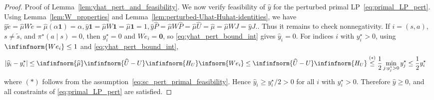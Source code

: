 \documentclass[mnsc,nonblindrev]{informs3}
\newcommand{\Phat}{\widehat{P}}
\newcommand{\one}{\mathbf{1}}
\newcommand{\pistar}{\pi^\star}
\newcommand{\zero}{\mathbf{0}}
\newcommand{\muhat}{\widehat{\mu}}
\newcommand{\uhat}{\widehat{U}}
\newcommand{\yhat}{\widehat{y}}
\begin{document}
\begin{APPENDICES}
\begin{proof}{Proof of Lemma~\ref{lem:yhat_pert_and_feasibility}.}
We now verify feasibility of \(\yhat\) for the perturbed primal
LP~\eqref{eq:primal_LP_pert}. Using Lemma~\ref{lem:W_properties} and Lemma~\ref{lem:perturbed-Uhat-Huhat-identities}, we have
\(
    \yhat\tilde e=\muhat W\tilde e=\muhat(\alpha\one)=\alpha,
    \yhat\one=\muhat W\one=\muhat\one=1, \yhat\Phat=\muhat W\Phat=\muhat\uhat=\muhat=\muhat WJ=\yhat J..
\)
Thus it remains to check nonnegativity. If \(i=(s,a)\), \(s\neq\tilde s\), and
\(\pistar(a\mid s)=0\), then \(y^\star_i=0\) and \(We_i=\zero\), so
\eqref{eq:yhat_pert_bound_int} gives \(\yhat_i=0\). For indices
\(i\) with \(y^\star_i>0\), using \(\infinfnorm{We_i}\le1\) and
\eqref{eq:yhat_pert_bound_int},
\begin{align*}
    |\yhat_i - y^\star_i| 
    &\leq \infinfnorm{\muhat} \infinfnorm{\uhat - U} \infinfnorm{H_{U}} \infnorm{We_i} 
    \leq \infinfnorm{\uhat - U} \infinfnorm{H_{U}} 
     \stackrel{(*)}{\leq} \frac{1}{2}\min_{j : y^\star_j > 0} y^\star_j \leq \frac{1}{2} y^\star_i
\end{align*}
where $(*)$ follows from the assumption~\eqref{eq:sc_pert_primal_feasibility}. Hence
\(\yhat_i\ge y^\star_i/2>0\) for all \(i\) with \(y^\star_i>0\).
Therefore \(\yhat\ge0\), and all constraints of
\eqref{eq:primal_LP_pert} are satisfied.

\end{proof}




\end{APPENDICES}
\end{document}
